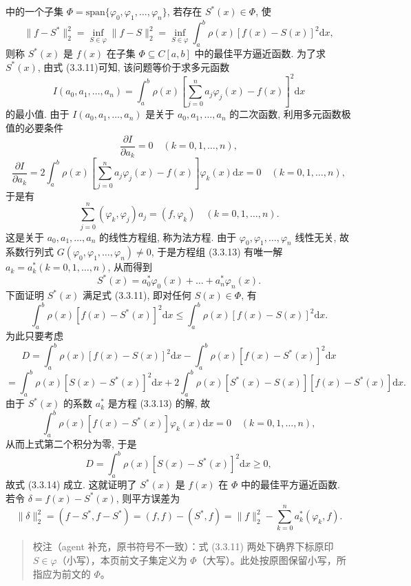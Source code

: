 中的一个子集 \(\Phi = \text{span}\{\varphi_0, \varphi_1, \dots, \varphi_n\}\), 若存在 \(S^*(x) \in \Phi\), 使 \[
\| f - S^* \|_2^2 = \inf_{S \in \varphi} \| f - S \|_2^2 = \inf_{S \in \varphi} \int_a^b \rho(x) [f(x) - S(x)]^2 \mathrm{d}x, \tag{3.3.11}
\] 则称 \(S^*(x)\) 是 \(f(x)\) 在子集 \(\Phi \subseteq C[a, b]\) 中的最佳平方逼近函数. 为了求 \(S^*(x)\), 由式 (3.3.11)可知, 该问题等价于求多元函数 \[
I(a_0, a_1, \dots, a_n) = \int_a^b \rho(x) \left[ \sum_{j=0}^n a_j \varphi_j(x) - f(x) \right]^2 \mathrm{d}x \tag{3.3.12}
\] 的最小值. 由于 \(I(a_0, a_1, \dots, a_n)\) 是关于 \(a_0, a_1, \dots, a_n\) 的二次函数, 利用多元函数极值的必要条件 \[
\frac{\partial I}{\partial a_k} = 0 \quad (k = 0, 1, \dots, n),
\] \[
\frac{\partial I}{\partial a_k} = 2 \int_a^b \rho(x) \left[ \sum_{j=0}^n a_j \varphi_j(x) - f(x) \right] \varphi_k(x) \mathrm{d}x = 0 \quad (k = 0, 1, \dots, n),
\] 于是有 \[
\sum_{j=0}^n (\varphi_k, \varphi_j) a_j = (f, \varphi_k) \quad (k = 0, 1, \dots, n). \tag{3.3.13}
\] 这是关于 \(a_0, a_1, \dots, a_n\) 的线性方程组, 称为法方程. 由于 \(\varphi_0, \varphi_1, \dots, \varphi_n\) 线性无关, 故系数行列式 \(G(\varphi_0, \varphi_1, \dots, \varphi_n) \neq 0\), 于是方程组 (3.3.13) 有唯一解 \(a_k = a_k^* (k = 0, 1, \dots, n)\), 从而得到 \[
S^*(x) = a_0^* \varphi_0(x) + \dots + a_n^* \varphi_n(x).
\] 下面证明 \(S^*(x)\) 满足式 (3.3.11), 即对任何 \(S(x) \in \Phi\), 有 \[
\int_a^b \rho(x) [f(x) - S^*(x)]^2 \mathrm{d}x \leqslant \int_a^b \rho(x) [f(x) - S(x)]^2 \mathrm{d}x. \tag{3.3.14}
\] 为此只要考虑 \[
D = \int_a^b \rho(x) [f(x) - S(x)]^2 \mathrm{d}x - \int_a^b \rho(x) [f(x) - S^*(x)]^2 \mathrm{d}x
\] \[
= \int_a^b \rho(x) [S(x) - S^*(x)]^2 \mathrm{d}x + 2 \int_a^b \rho(x) [S^*(x) - S(x)] [f(x) - S^*(x)] \mathrm{d}x.
\] 由于 \(S^*(x)\) 的系数 \(a_k^*\) 是方程 (3.3.13) 的解, 故 \[
\int_a^b \rho(x) [f(x) - S^*(x)] \varphi_k(x) \mathrm{d}x = 0 \quad (k = 0, 1, \dots, n),
\] 从而上式第二个积分为零, 于是 \[
D = \int_a^b \rho(x) [S(x) - S^*(x)]^2 \mathrm{d}x \geqslant 0,
\] 故式 (3.3.14) 成立. 这就证明了 \(S^*(x)\) 是 \(f(x)\) 在 \(\Phi\) 中的最佳平方逼近函数. 若令 \(\delta = f(x) - S^*(x)\), 则平方误差为 \[
\|\delta\|_2^2 = (f - S^*, f - S^*) = (f, f) - (S^*, f) = \|f\|_2^2 - \sum_{k=0}^n a_k^* (\varphi_k, f). \tag{3.3.15}
\]

\begin{quote}
校注（agent 补充，原书符号不一致）：式 (3.3.11) 两处下确界下标原印 \(S\in\varphi\)（小写），本页前文子集定义为 \(\Phi\)（大写）。此处按原图保留小写，所指应为前文的 \(\Phi\)。
\end{quote}

